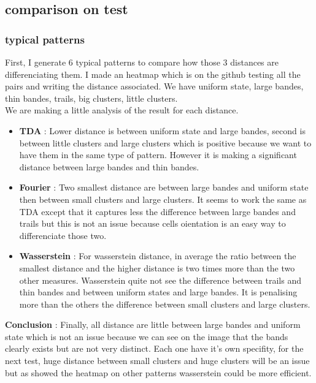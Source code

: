 \documentclass{article}
\begin{document}
\subsection{comparison on test}
\subsubsection{typical patterns}
First, I generate 6 typical patterns to compare how those 3 distances are differenciating them. I made an heatmap which is on the github testing all the pairs and writing the distance associated. We have uniform state, large bandes, thin bandes, trails, big clusters, little clusters.\\
We are making a little analysis of the result for each distance.
\begin{itemize}
    \item \textbf{TDA} : Lower distance is between uniform state and large bandes, second is between little clusters and large clusters which is positive because we want to have them in the same type of pattern. However it is making a significant distance between large bandes and thin bandes.
    \item \textbf{Fourier} : Two smallest distance are between large bandes and uniform state then between small clusters and large clusters. It seems to work the same as TDA except that it captures less the difference between large bandes and trails but this is not an issue because cells oientation is an easy way to differenciate those two.
    \item \textbf{Wasserstein} : For wasserstein distance, in average the ratio between the smallest distance and the higher distance is two times more than the two other measures. Wasserstein quite not see the difference between trails and thin bandes and between uniform states and large bandes. It is penalising more than the others the difference between small clusters and large clusters.
\end{itemize}

\textbf{Conclusion} : Finally, all distance are little between large bandes and uniform state which is not an issue because we can see on the image that the bands clearly exists but are not very distinct. Each one have it's own specifity, for the next test, huge distance between small clusters and huge clusters will be an issue but as showed the heatmap on other patterns wasserstein could be more efficient.
\end{document}
